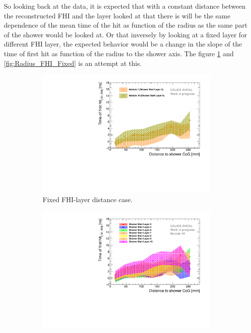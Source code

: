 So looking back at the data, it is expected that with a constant distance between the reconstructed FHI and the layer looked at that there is will be the same dependence of the mean time of the hit as function of the radius as the same part of the shower would be looked at. Or that inversely by looking at a fixed layer for different FHI layer, the expected behavior would be a change in the slope of the time of first hit as function of the radius to the shower axis. The figure \ref{fig:Radius_FHI} and \ref{fig:Radius_FHI_Fixed} is an attempt at this.

\begin{figure}[htbp!]
	\begin{subfigure}[t]{0.45\textwidth}
		\centering
		\includegraphics[width=1\textwidth]{chap5/fig_AHCAL_timing/Pions/Timing_Radius_Comparison_ShortAsymRange_ShowerStart.pdf}
		\caption{Fixed FHI-layer distance case.}\label{fig:Radius_FHI}
	\end{subfigure}
	\hfill
	\begin{subfigure}[t]{0.45\textwidth}
		\centering
		\includegraphics[width=1\textwidth]{chap5/fig_AHCAL_timing/Pions/Timing_Radius_Comparison_ShortAsymRange_ShowerStart_FixedModule.pdf}

\end{subfigure}
\end{figure}
